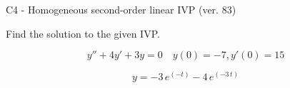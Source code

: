 \begin{exercise}
  \begin{exerciseTitle}C4 - Homogeneous second-order linear IVP (ver. 83)\end{exerciseTitle}
  \begin{exerciseStatement}
    
Find the solution to the given IVP.

    
\[y''+4y'+3y = 0 \hspace{1em} y(0) = -7 , y'(0) = 15\]

  \end{exerciseStatement}
  \begin{exerciseAnswer}
    
\[y= -3 \, e^{\left(-t\right)} - 4 \, e^{\left(-3 \, t\right)}\]

  \end{exerciseAnswer}
\end{exercise}